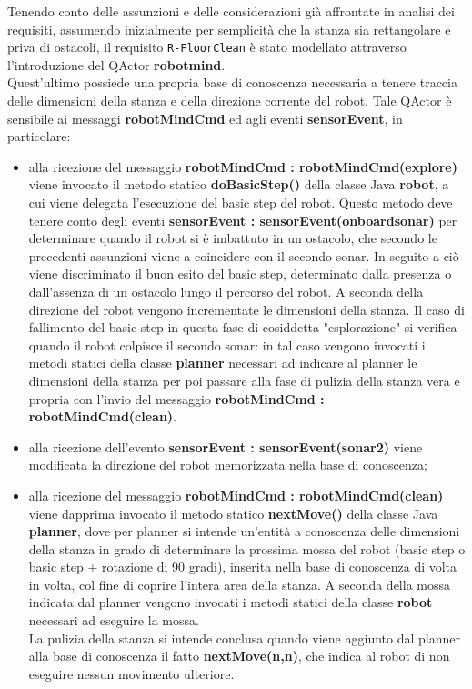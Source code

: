 \documentclass{llncs}
\newcommand{\code}[1]{{\color{blue}\small{\texttt{#1}}}}
\begin{document}
Tenendo conto delle assunzioni e delle considerazioni già affrontate in analisi dei requisiti, assumendo inizialmente per semplicità che la stanza sia rettangolare e priva di ostacoli, il requisito \code{R-FloorClean} è stato modellato attraverso l'introduzione del QActor \textbf{robotmind}. \\ Quest'ultimo possiede una propria base di conoscenza necessaria a tenere traccia delle dimensioni della stanza e della direzione corrente del robot. Tale QActor è sensibile ai messaggi \textbf{robotMindCmd} ed agli eventi \textbf{sensorEvent}, in particolare:
\begin{itemize}
	\item alla ricezione del messaggio \textbf{robotMindCmd : robotMindCmd(explore)} viene invocato il metodo statico \textbf{doBasicStep()} della classe Java \textbf{robot}, a cui viene delegata l'esecuzione del basic step del robot. Questo metodo deve tenere conto degli eventi \textbf{sensorEvent : sensorEvent(onboardsonar)} per determinare quando il robot si è imbattuto in un ostacolo, che secondo le precedenti assunzioni viene a coincidere con il secondo sonar. In seguito a ciò viene discriminato il buon esito del basic step, determinato dalla presenza o dall'assenza di un ostacolo lungo il percorso del robot. A seconda della direzione del robot vengono incrementate le dimensioni della stanza. Il caso di fallimento del basic step in questa fase di cosiddetta "esplorazione" si verifica quando il robot colpisce il secondo sonar: in tal caso vengono invocati i metodi statici della classe \textbf{planner} necessari ad indicare al planner le dimensioni della stanza per poi passare alla fase di pulizia della stanza vera e propria con l'invio del messaggio \textbf{robotMindCmd : robotMindCmd(clean)}.
	\item alla ricezione dell'evento \textbf{sensorEvent : sensorEvent(sonar2)} viene modificata la direzione del robot memorizzata nella base di conoscenza;
	\item alla ricezione del messaggio \textbf{robotMindCmd : robotMindCmd(clean)} viene dapprima invocato il metodo statico \textbf{nextMove()} della classe Java \textbf{planner}, dove per planner si intende un'entità a conoscenza delle dimensioni della stanza in grado di determinare la prossima mossa del robot (basic step o basic step + rotazione di 90 gradi), inserita nella base di conoscenza di volta in volta, col fine di coprire l'intera area della stanza. A seconda della mossa indicata dal planner vengono invocati i metodi statici della classe \textbf{robot} necessari ad eseguire la mossa. \\ La pulizia della stanza si intende conclusa quando viene aggiunto dal planner alla base di conoscenza il fatto \textbf{nextMove(n,n)}, che indica al robot di non eseguire nessun movimento ulteriore. 
\end{itemize}
\end{document}
